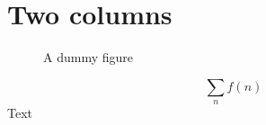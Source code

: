 \documentclass{article}
\begin{document}
\twocolumn
\section*{Two columns}
\blindtext[3]
\begin{figure}
  \centering
  \caption{A dummy figure}
\end{figure}
\begin{equation}
\sum_n f(n)
\end{equation}
Text
\end{document}
